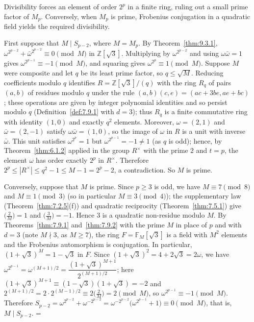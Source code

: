 \documentclass[11pt]{article}
\makeatletter
\let\nt@closedisplay\]
\def\nt@guardedclose{\@ifnextchar\par{\nt@closeafterpar}{\@ifnextchar\end{\postdisplaypenalty\@M\nt@closedisplay}{\nt@closedisplay}}}
\def\nt@closeafterpar\par{\@ifnextchar\par{\nt@closeafterpar}{\@ifnextchar\end{\postdisplaypenalty\@M\nt@closedisplay\par}{\nt@closedisplay\par}}}
\renewenvironment{proof}[1][\proofname]{\par
  \pushQED{\qed}\normalfont\topsep\medskipamount\edef\nt@afterproof{\@endparpenalty=\the\@endparpenalty\relax}\@beginparpenalty\@M\@endparpenalty\@M\let\]\nt@guardedclose\trivlist\item[]\textit{#1\@addpunct{.}} \ignorespaces}{\ifvmode\addpenalty\@M\fi\popQED\nt@afterproof\endtrivlist\@endpefalse}
\theoremstyle{ntstyle}
\newcommand{\legs}[2]{\bigl(\tfrac{#1}{#2}\bigr)}
\makeatother
\begin{document}
\begin{proof} Divisibility forces an element of order $2^p$ in a finite ring,
  ruling out a small prime factor of $M_p$. Conversely, when $M_p$ is prime,
  Frobenius conjugation in a quadratic field yields the required divisibility.

  First suppose that $M\mid S_{p-2}$, where $M=M_p$.
  By Theorem~\ref{thm:9.3.1},
  $\omega^{2^{p-2}}+\bar\omega^{2^{p-2}}\equiv0\pmod{M}$ in
  $\mathbb{Z}[\sqrt{3}]$. Multiplying by $\omega^{2^{p-2}}$ and using
  $\omega\bar\omega=1$ gives $\omega^{2^{p-1}}\equiv-1\pmod{M}$, and
  squaring gives $\omega^{2^{p}}\equiv1\pmod{M}$. Suppose $M$ were
  composite and let $q$ be its least prime factor, so $q\le\sqrt{M}$.
  Reducing coefficients modulo $q$ identifies
  $R=\mathbb{Z}[\sqrt{3}]/(q)$ with the ring $R_q$ of pairs $(a,b)$ of
  residues modulo $q$ under the rule $(a,b)(c,e)=(ac+3be,ae+bc)$; these
  operations are given by integer polynomial identities and so persist modulo $q$
  (Definition~\ref{def:7.9.1} with $d=3$); thus $R_q$ is a finite commutative
  ring with identity $(1,0)$ and exactly $q^{2}$ elements.
  Moreover, $\omega=(2,1)$ and $\bar\omega=(2,-1)$ satisfy
  $\omega\bar\omega=(1,0)$, so the image of $\omega$ in $R$ is a unit with inverse $\bar\omega$. This
  unit satisfies $\omega^{2^{p}}=1$ but $\omega^{2^{p-1}}=-1\neq1$ (as
  $q$ is odd); hence, by Theorem~\ref{thm:6.1.2} applied in the group $R^{\times}$ with
  the prime $2$ and $t=p$, the element $\omega$ has order exactly $2^{p}$ in
  $R^{\times}$.
  Therefore $2^{p}\le|R^{\times}|\le q^2-1\le M-1=2^{p}-2$, a contradiction. So $M$ is prime.

  Conversely, suppose that $M$ is prime. Since
  $p\ge3$ is odd, we have $M\equiv7\pmod{8}$ and $M\equiv1\pmod{3}$
  (so in particular $M\equiv3\pmod{4}$); the supplementary law (Theorem~\ref{thm:7.2.5}(f)) and
  quadratic reciprocity (Theorem~\ref{thm:7.5.1})
  give $\legs{2}{M}=1$ and $\legs{3}{M}=-1$. Hence
  $3$ is a quadratic non-residue modulo $M$. By
  Theorems~\ref{thm:7.9.1} and~\ref{thm:7.9.2} with the prime $M$ in place of $p$ and with $d=3$ (note $M\nmid3$,
  as $M\ge7$),
  the ring $F=\mathbb{F}_M[\sqrt{3}]$ is a field with $M^2$ elements and the
  Frobenius automorphism is conjugation. In particular,
  $(1+\sqrt{3})^{M}=1-\sqrt{3}$ in $F$. Since
  $(1+\sqrt{3})^2=4+2\sqrt{3}=2\omega$,
  we have $\omega^{2^{p-1}}=\omega^{(M+1)/2}=\dfrac{(1+\sqrt{3})^{M+1}}{2^{(M+1)/2}}$;
  here $(1+\sqrt{3})^{M+1}\equiv(1-\sqrt{3})(1+\sqrt{3})=-2$ and
  $2^{(M+1)/2}=2\cdot2^{(M-1)/2}\equiv2\legs{2}{M}=2\pmod{M}$,
  so $\omega^{2^{p-1}}\equiv-1\pmod{M}$. Therefore
  $S_{p-2}=\omega^{2^{p-2}}+\omega^{-2^{p-2}}=\omega^{-2^{p-2}}\big(\omega^{2^{p-1}}+1\big)\equiv0\pmod{M}$, that
  is, $M\mid S_{p-2}$.
\end{proof}
\end{document}
